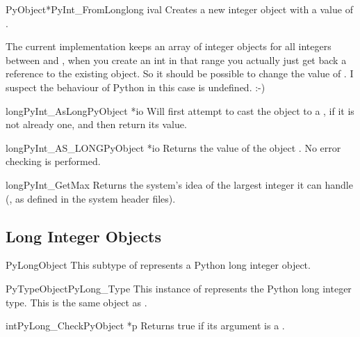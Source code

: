 \documentclass{manual}
\begin{document}
\begin{cfuncdesc}{PyObject*}{PyInt_FromLong}{long ival}
Creates a new integer object with a value of .

The current implementation keeps an array of integer objects for all
integers between  and , when you create an int in
that range you actually just get back a reference to the existing
object. So it should be possible to change the value of . I
suspect the behaviour of Python in this case is undefined. :-)
\end{cfuncdesc}

\begin{cfuncdesc}{long}{PyInt_AsLong}{PyObject *io}
Will first attempt to cast the object to a , if
it is not already one, and then return its value.
\end{cfuncdesc}

\begin{cfuncdesc}{long}{PyInt_AS_LONG}{PyObject *io}
Returns the value of the object .  No error checking is
performed.
\end{cfuncdesc}

\begin{cfuncdesc}{long}{PyInt_GetMax}{}
Returns the system's idea of the largest integer it can handle
(, as defined in the system
header files).
\end{cfuncdesc}


\subsection{Long Integer Objects \label{longObjects}}

\begin{ctypedesc}{PyLongObject}
This subtype of  represents a Python long integer
object.
\end{ctypedesc}

\begin{cvardesc}{PyTypeObject}{PyLong_Type}
This instance of  represents the Python long
integer type.  This is the same object as .
\end{cvardesc}

\begin{cfuncdesc}{int}{PyLong_Check}{PyObject *p}
Returns true if its argument is a .
\end{cfuncdesc}
\end{document}
